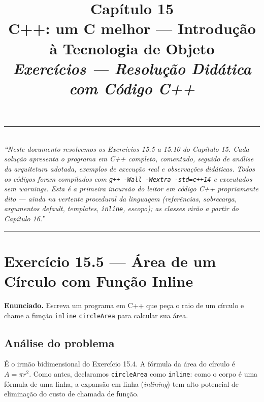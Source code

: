 \documentclass[11pt,a4paper]{article}
\title{
  \vspace{-1cm}
  {\Huge\bfseries\color{deitelblue} Cap\'itulo 15}\\[0.3em]
  {\Large\bfseries C++: um C melhor --- Introdu\c{c}\~ao \`a Tecnologia de Objeto}\\[0.8em]
  {\large\itshape Exerc\'icios --- Resolu\c{c}\~ao Did\'atica com C\'odigo C++}
}
\author{}
\date{}
\begin{document}
\maketitle
\thispagestyle{empty}
\vspace{-2em}

\begin{center}
\rule{0.85\textwidth}{0.5pt}\\[0.4em]
\textit{``Neste documento resolvemos os Exerc\'icios 15.5 a 15.10 do Cap\'itulo 15. Cada solu\c{c}\~ao apresenta o programa em C++ completo, comentado, seguido de an\'alise da arquitetura adotada, exemplos de execu\c{c}\~ao real e observa\c{c}\~oes did\'aticas. Todos os c\'odigos foram compilados com \texttt{g++ -Wall -Wextra -std=c++14} e executados sem warnings. Esta \'e a primeira incurs\~ao do leitor em c\'odigo C++ propriamente dito --- ainda na vertente \emph{procedural} da linguagem (refer\^encias, sobrecarga, argumentos default, templates, \texttt{inline}, escopo); as classes vir\~ao a partir do Cap\'itulo 16.''}\\[0.4em]
\rule{0.85\textwidth}{0.5pt}
\end{center}

\vspace{1em}

\section{Exerc\'icio 15.5 --- \'Area de um C\'irculo com Fun\c{c}\~ao Inline}

\begin{enunciado}
\textbf{Enunciado.} Escreva um programa em C++ que pe\c{c}a o raio de um c\'irculo e chame a fun\c{c}\~ao \texttt{inline} \texttt{circleArea} para calcular sua \'area.
\end{enunciado}

\subsection*{An\'alise do problema}

\'E o irm\~ao bidimensional do Exerc\'icio 15.4. A f\'ormula da \'area do c\'irculo \'e $A = \pi r^{2}$. Como antes, declaramos \texttt{circleArea} como \texttt{inline}: como o corpo \'e uma f\'ormula de uma linha, a expans\~ao em linha (\emph{inlining}) tem alto potencial de elimina\c{c}\~ao do custo de chamada de fun\c{c}\~ao.
\end{document}
